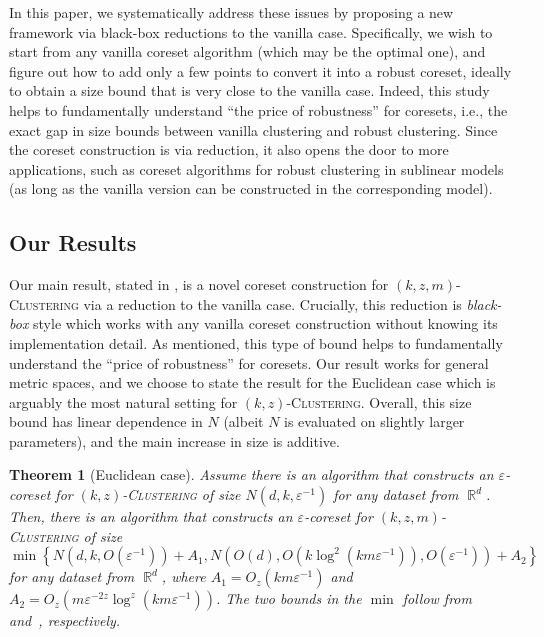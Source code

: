 \documentclass[letterpaper,11pt]{article}
\theoremstyle{plain}
\newtheorem{theorem}{Theorem}[section]
\theoremstyle{definition}
\theoremstyle{remark}
\DeclareMathOperator{\R}{\mathbb{R}}
\newcommand{\eps}{\varepsilon}
\newcommand{\ProblemName}[1]{\textsc{#1}}
\newcommand{\kzC}{\ProblemName{$(k,z)$-Clustering}\xspace}
\newcommand{\kzmC}{\ProblemName{$(k,z,m)$-Clustering}\xspace}
\begin{document}
In this paper, we systematically address these issues
by proposing a new framework via black-box reductions to the vanilla case.
Specifically, we wish to start from any vanilla coreset algorithm (which may be the optimal one),
and figure out how to add only a few points to convert it into a robust coreset,
ideally to obtain a size bound that is very close to the vanilla case.
Indeed, this study helps to fundamentally understand ``the price of robustness'' for coresets, i.e., the exact gap in size bounds between vanilla clustering and robust clustering.
Since the coreset construction is via reduction,
it also opens the door to more applications,
such as coreset algorithms for robust clustering in sublinear models
(as long as the vanilla version can be constructed in the corresponding model).





\subsection{Our Results}

Our main result, stated in , is a novel coreset construction for \kzmC via a reduction to the vanilla case.
Crucially, this reduction is \emph{black-box} style which works with any vanilla coreset construction without knowing its implementation detail.
As mentioned, this type of bound helps to fundamentally understand the ``price of robustness'' for coresets.
Our result works for general metric spaces, and we choose to state the result for the Euclidean case which is arguably the most natural setting for \kzC.
Overall, this size bound has linear dependence in $N$ (albeit $N$ is evaluated on slightly larger parameters), and the main increase in size is additive.


\begin{theorem}[Euclidean case]
    \label{thm:informal}
    Assume there is an algorithm that constructs an $\eps$-coreset for \kzC of size $N(d,k,\eps^{-1})$ for any dataset from $\R^d$.
Then, there is an algorithm that 
constructs an $\eps$-coreset for \kzmC of size 
    \begin{equation}
        \label{eq:intro_size}
        \min\left\{N(d,k,O(\eps^{-1})) + A_1, N\left(O(d),O(k\log^2(km\eps^{-1})),O(\eps^{-1})\right) + A_2\right\}
    \end{equation}
    for any dataset from $\R^d$, where $A_1 = O_z\left(km\eps^{-1}\right)$ and $A_2 = O_z\left( m\eps^{-2z} \log^z(km\eps^{-1})\right)$.
The two bounds in the $\min$ follow from~ and~, respectively.
\end{theorem}
\end{document}
